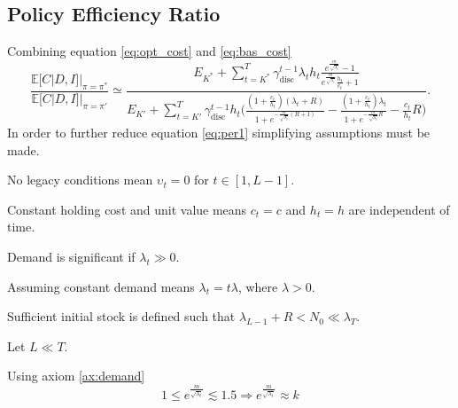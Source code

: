 \subsection{Policy Efficiency Ratio}
Combining equation \eqref{eq:opt_cost} and \eqref{eq:bas_cost}
\begin{equation}
	\frac{\mathbb{E}[C|D,I]|_{\pi = \pi^*} }{\mathbb{E}[C|D,I]|_{\pi = \pi'}}\simeq \frac{E_{K^*}+\sum_{t=K^*}^{T} \gamma_{\text{disc}}^{t-1} \lambda_th_t\frac{e^{\frac{m}{\sqrt{\lambda_t}}}-1}{e^{\frac{m}{\sqrt{\lambda_t}}}\frac{h_t}{c_t}+1}}{E_{K'}+\sum_{t=K'}^{T} \gamma_{\text{disc}}^{t-1}h_t \bigg( 
		\frac{(1+\frac{c_t}{h_t})(\lambda_t+R)}{1+e^{-\frac{m}{\sqrt{\lambda_t}}(R+1)}}- \frac{(1+\frac{c_t}{h_t})\lambda_t}{1+e^{-\frac{m}{\sqrt{\lambda_t}}R}} - \frac{c_t}{h_t}R\bigg)}.
	\label{eq:per1}
\end{equation}
In order to further reduce equation \eqref{eq:per1} simplifying assumptions must be made.
\begin{axiom}
	\label{ax:leg}
	 No legacy conditions mean $\upsilon_t=0$ for $t\in [1,L-1]$.
\end{axiom}
\begin{axiom}
	\label{ax:const}
	Constant holding cost and unit value means $c_t=c$ and $h_t=h$ are independent of time.
\end{axiom}
\begin{axiom}
	\label{ax:demand}
	Demand is significant if $\lambda_t\gg 0$.
\end{axiom}

\begin{axiom}
	\label{ax:const_demand}
	Assuming constant demand means $\lambda_t=t\lambda$, where $\lambda >0$.
\end{axiom}

\begin{axiom}
	\label{ax:initial_stock}
	Sufficient initial stock is defined such that $\lambda_{L-1} + R < N_0\ll \lambda_T$.
\end{axiom}

\begin{axiom}
	Let $L\ll T$.
\end{axiom}

Using axiom \ref{ax:demand}
\begin{equation}
	1\leq e^{\frac{m}{\sqrt{\lambda_t}}}\lesssim 1.5 \Rightarrow  e^{\frac{m}{\sqrt{\lambda_t}}}\approx k
	\label{eq:k}
\end{equation}


